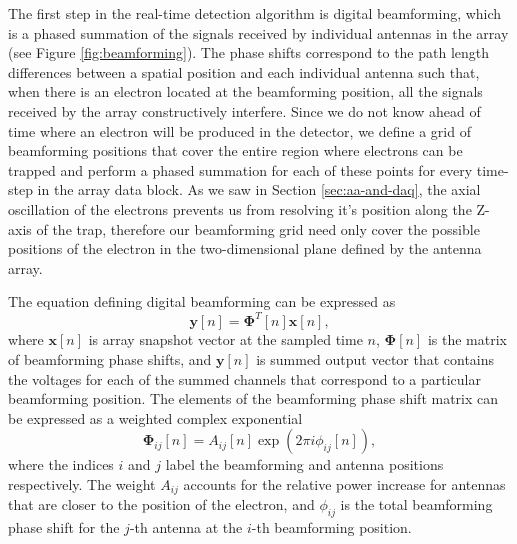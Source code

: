 The first step in the real-time detection algorithm is digital beamforming, which is a phased summation of the signals received by individual antennas in the array (see Figure \ref{fig:beamforming}). The phase shifts correspond to the path length differences between a spatial position and each individual antenna such that, when there is an electron located at the beamforming position, all the signals received by the array constructively interfere. Since we do not know ahead of time where an electron will be produced in the detector, we define a grid of beamforming positions that cover the entire region where electrons can be trapped and perform a phased summation for each of these points for every time-step in the array data block. As we saw in Section \ref{sec:aa-and-daq}, the axial oscillation of the electrons prevents us from resolving it's position along the Z-axis of the trap, therefore our beamforming grid need only cover the possible positions of the electron in the two-dimensional plane defined by the antenna array. 

The equation defining digital beamforming can be expressed as
\begin{equation}
    \mathbf{y}[n] = \mathbf{\Phi}^T[n]\mathbf{x}[n],
    \label{eq:beamforming}
\end{equation}
where $\mathbf{x}[n]$ is array snapshot vector at the sampled time $n$, $\mathbf{\Phi}[n]$ is the matrix of beamforming phase shifts, and $\mathbf{y}[n]$ is summed output vector that contains the voltages for each of the summed channels that correspond to a particular beamforming position. %
The elements of the beamforming phase shift matrix can be expressed as a weighted complex exponential
\begin{equation}
    \mathbf{\Phi}_{ij}[n]=A_{ij}[n]\exp{\left(2\pi i\phi_{ij}[n]\right)},
\end{equation}
where the indices $i$ and $j$ label the beamforming and antenna positions respectively. The weight $A_{ij}$ accounts for the relative power increase for antennas that are closer to the position of the electron, and $\phi_{ij}$ is the total beamforming phase shift for the $j$-th antenna at the $i$-th beamforming position.

